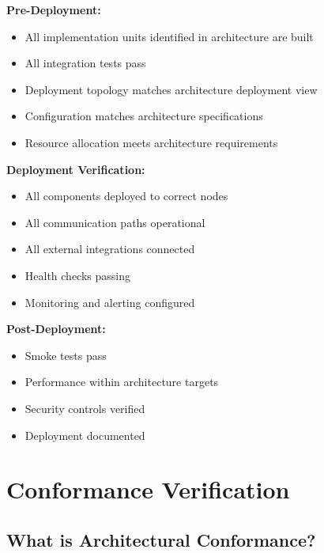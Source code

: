 \documentclass[11pt]{article}
\begin{document}
\begin{checklistbox}

\textbf{Pre-Deployment:}
\begin{itemize}[leftmargin=1.5cm]
    \item[$\square$] All implementation units identified in architecture are built
    \item[$\square$] All integration tests pass
    \item[$\square$] Deployment topology matches architecture deployment view
    \item[$\square$] Configuration matches architecture specifications
    \item[$\square$] Resource allocation meets architecture requirements
\end{itemize}

\textbf{Deployment Verification:}
\begin{itemize}[leftmargin=1.5cm]
    \item[$\square$] All components deployed to correct nodes
    \item[$\square$] All communication paths operational
    \item[$\square$] All external integrations connected
    \item[$\square$] Health checks passing
    \item[$\square$] Monitoring and alerting configured
\end{itemize}

\textbf{Post-Deployment:}
\begin{itemize}[leftmargin=1.5cm]
    \item[$\square$] Smoke tests pass
    \item[$\square$] Performance within architecture targets
    \item[$\square$] Security controls verified
    \item[$\square$] Deployment documented
\end{itemize}
\end{checklistbox}

\section{Conformance Verification}

\subsection{What is Architectural Conformance?}
\end{document}

